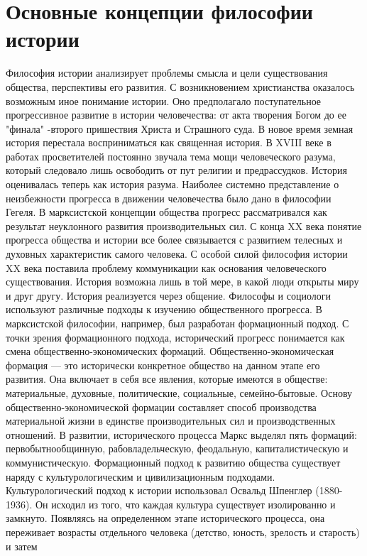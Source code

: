 \documentclass[12pt]{article}
\begin{document}
\section{Основные концепции философии истории}
Философия истории анализирует проблемы смысла и цели существования общества, перспективы его развития.
С  возникновением  христианства  оказалось  возможным  иное  понимание  истории.  Оно  предполагало
поступательное прогрессивное развитие в истории человечества: от акта творения Богом до ее "финала" -второго пришествия Христа и Страшного суда. В новое время земная история перестала восприниматься как
священная история. В XVIII веке в работах просветителей постоянно звучала тема мощи человеческого разума,
который следовало лишь освободить от пут религии и предрассудков. История оценивалась теперь как история
разума. Наиболее системно представление о неизбежности прогресса в движении человечества было дано в
философии Гегеля. В марксистской концепции общества прогресс рассматривался как результат неуклонного
развития производительных сил. С конца XX века понятие прогресса общества и истории все более связывается
с развитием телесных и духовных характеристик самого человека. С особой силой философия истории XX века
поставила проблему коммуникации как основания человеческого существования. История возможна лишь в той
мере, в какой люди открыты миру и друг другу. История реализуется через общение.
Философы и социологи используют различные подходы к изучению общественного прогресса. В марксистской
философии,  например,  был  разработан  формационный  подход.  С  точки  зрения  формационного  подхода,
исторический  прогресс  понимается  как  смена  общественно-экономических  формаций.  Общественно-экономическая формация --- это исторически конкретное общество на данном этапе его развития. Она включает в  
себя все явления, которые имеются в обществе: материальные, духовные, политические, социальные, семейно-бытовые. Основу общественно-экономической формации составляет способ производства материальной жизни
в единстве производительных сил и производственных отношений. В развитии, исторического процесса Маркс
выделял  пять  формаций:  первобытнообщинную,  рабовладельческую,  феодальную,  капиталистическую  и
коммунистическую. Формационный подход к развитию общества существует наряду с культурологическим и
цивилизационным подходами.
Культурологический подход к истории использовал Освальд Шпенглер (1880-1936). Он исходил из того, что
каждая  культура  существует  изолированно  и  замкнуто.  Появляясь  на  определенном  этапе  исторического
процесса,  она  переживает  возрасты  отдельного  человека  (детство,  юность,  зрелость  и  старость)  и  затем
\end{document}
